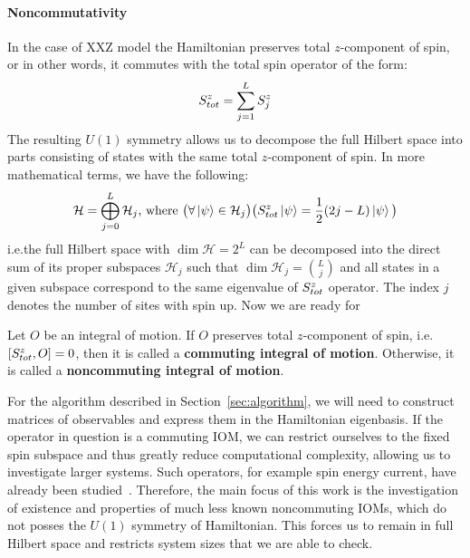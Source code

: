 \paragraph{Noncommutativity}In the case of XXZ model the Hamiltonian preserves total \(z\)-component of spin,
or in other words, it commutes with the total spin operator of the form:
\begin{equation}
  S^{z}_{tot} = \sum_{j = 1}^{L} S^{z}_j
  \label{eq:magnetization}
\end{equation}
The resulting \(U(1)\) symmetry allows us to decompose the full Hilbert space into parts consisting of states with the same total \(z\)-component
of spin. In more mathematical terms, we have the following:
\begin{equation*}
  \mathcal{H} = \bigoplus_{j = 0}^{L} \mathcal{H}_j \text{, where } \big(\forall \ket{\psi} \in \mathcal{H}_j \big) \big(S^{z}_{tot} \ket{\psi} = \frac{1}{2}(2j-L) \ket{\psi} \big)
\end{equation*}
i.e.\;the full Hilbert space with \(\dim{\mathcal{H}} = 2^L\) can be decomposed into the direct sum of its proper subspaces
\(\mathcal{H}_j\) such that \(\dim{\mathcal{H}_j} = \binom{L}{j}\) and all states in a given subspace correspond to the same
eigenvalue of \(S^{z}_{tot}\) operator. The index \(j\) denotes the number of sites with spin up.
Now we are ready for
\begin{definition}
  Let \(O\) be an integral of motion. If \(O\) preserves total \(z\)-component of spin, i.e.
  \(\comm{\Sz_{tot}}{O} = 0\), then it is called a \textbf{commuting integral of motion}.
  Otherwise, it is called a \textbf{noncommuting integral of motion}.\label{def:noncomm def}
\end{definition}
For the algorithm described in Section~\ref{sec:algorithm}, we will need to construct matrices of
observables and express them in the Hamiltonian eigenbasis. If the operator in question is a
commuting IOM, we can restrict ourselves to the fixed spin subspace and thus greatly reduce
computational complexity, allowing us to investigate larger systems. Such operators, for example
spin energy current, have already been studied~\autocite{Mierzejewski2015Approx}. Therefore,
the main focus of this work is the investigation of existence and properties of much less known
noncommuting IOMs, which do not posses the \(U(1)\) symmetry of Hamiltonian. 
This forces us to remain in full Hilbert space and restricts system sizes that we are able to check.


